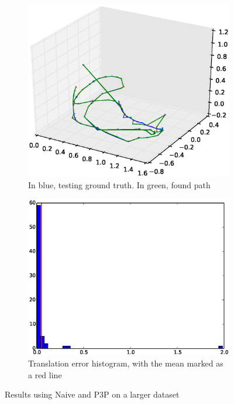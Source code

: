 \begin{figure}[htpb]
  \begin{subfigure}[b]{6cm}
          \includegraphics[width=\linewidth]{img/large_desktop/naive_3pt_path.eps}
          \caption{In blue, testing ground truth. In green, found path}                
          \label{fig:desktop_2_ferns_path_1}
  \end{subfigure}   
  \qquad
  \begin{subfigure}[b]{6cm}
          \includegraphics[width=\linewidth]{img/large_desktop/naive_3pt_dist.eps}
          \caption{Translation error histogram, with the mean marked as a red line}                
          \label{fig:desktop_2_ferns_dist_1}
  \end{subfigure}
  \caption{Results using Naive and P3P on a larger dataset}
\end{figure}


